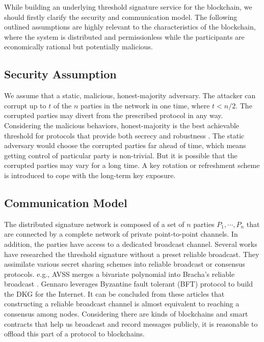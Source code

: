 \documentclass[11pt]{article}
\begin{document}
While building an underlying threshold signature service for the blockchain, we should firstly clarify the security and communication model. The following outlined assumptions are highly relevant to the characteristics of the blockchain, where the system is distributed and permissionless while the participants are economically rational but potentially malicious.

\subsection{Security Assumption}

We assume that a static, malicious, honest-majority adversary. The attacker can corrupt up to $t$ of the $n$ parties in the network in one time, where $t < n/2$. The corrupted parties may divert from the prescribed protocol in any way. Considering the malicious behaviors, honest-majority is the best achievable threshold for protocols that provide both secrecy and robustness \cite{gennaro2007secure}. The static adversary would choose the corrupted parties far ahead of time, which means getting control of particular party is non-trivial. But it is possible that the corrupted parties may vary for a long time. A key rotation or refreshment scheme is introduced to cope with the long-term key exposure.

\subsection{Communication Model}

The distributed signature network is composed of a set of $n$ parties $P_1, \cdots, P_n$ that are connected by a complete network of private point-to-point channels. In addition, the parties have access to a dedicated broadcast channel. Several works\cite{kate2009distributed,kate2012distributed,cachin2002asynchronous} have researched the threshold signature without a preset reliable broadcast. They assimilate various secret sharing schemes into reliable broadcast or consensus protocols. e.g., AVSS\cite{cachin2002asynchronous} merges a bivariate polynomial into Bracha’s reliable broadcast \cite{bracha1984asynchronous}. Gennaro\cite{gennaro2007secure} leverages Byzantine fault tolerant (BFT) protocol\cite{castro1999practical} to build the DKG for the Internet. It can be concluded from these articles that constructing a reliable broadcast channel is almost equivalent to reaching a consensus among nodes. Considering there are kinds of blockchains and smart contracts that help us broadcast and record messages publicly, it is reasonable to offload this part of a protocol to blockchains.
\end{document}
